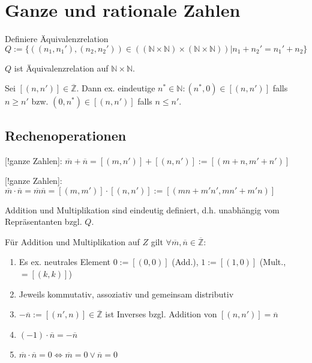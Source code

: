 \section{Ganze und rationale Zahlen}
\begin{definition}
	Definiere Äquivalenzrelation $Q:=\{ ((n_1,n_1'),(n_2,n_2'))\in((\mathbb{N}\times\mathbb{N})\times(\mathbb{N}\times\mathbb{N})) | n_1+n_2' = n_1' + n_2 \}$
\end{definition}
\begin{satz}
	$Q$ ist Äquivalenzrelation auf $\mathbb{N}\times\mathbb{N}$.
\end{satz}

\begin{satz}
	Sei $[(n,n')]\in\overline{\mathbb{Z}}$. Dann ex. eindeutige $n^{*}\in\mathbb{N}:(n^{*},0)\in[(n,n')]$ falls $n\geq n'$ bzw. $(0,n^{*})\in[(n,n')]$ falls $n\leq n'$.
\end{satz}

\subsection*{Rechenoperationen}
\begin{definition}
	[!ganze Zahlen]: $\overline{m}+\overline{n} = [(m,n')] + [(n,n')] :=[(m+n,m'+n')]$
	
	[!ganze Zahlen]: $\overline{m}\cdot\overline{n} = \overline{m}\overline{n} = [(m,m')]\cdot[(n,n')]:=[(mn+m'n',mn'+m'n)]$
\end{definition}

\begin{satz}
	Addition und Multiplikation sind eindeutig definiert, d.h. unabhängig vom Repräsentanten bzgl. $Q$.
\end{satz}

\begin{satz}
	Für Addition und Multiplikation auf $Z$ gilt $\forall \overline{m},\overline{n}\in\overline{\mathbb{Z}}$:
	\begin{enumerate}[label={\arabic*)}]
		\item Es ex. neutrales Element $0:=[(0,0)]$ (Add.), $1:=[(1,0)]$ (Mult., $=[(k,k)]$)
		\item Jeweils kommutativ, assoziativ und gemeinsam distributiv
		\item $-\overline{n} := [(n',n)]\in\overline{\mathbb{Z}}$ ist Inverses bzgl. Addition von $[(n,n')]=\overline{n}$
		\item $(-1)\cdot \overline{n} = -\overline{n}$
		\item $\overline{m}\cdot\overline{n} = 0 \Leftrightarrow \overline{m} = 0 \lor \overline{n} = 0$
	\end{enumerate}
\end{satz}

